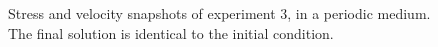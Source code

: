\begin{figure}
\centerline{
}
\caption{Stress and velocity snapshots of experiment 3, in a periodic medium.  The final solution is identical to the initial condition.\label{fig:experiment3}}
\end{figure}

